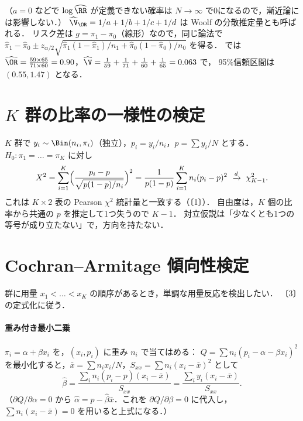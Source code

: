 （$a=0$ などで $\log\widehat{\RR}$ が定義できない確率は $N\to\infty$ で0になるので，漸近論には影響しない．）
$\widehat\V_{\OR}=1/a+1/b+1/c+1/d$ は Woolf の分散推定量とも呼ばれる．
リスク差は $g=\pi_1-\pi_0$（線形）なので，同じ論法で $\hat\pi_1-\hat\pi_0\pm z_{\alpha/2}\sqrt{\hat\pi_1(1-\hat\pi_1)/n_1+\hat\pi_0(1-\hat\pi_0)/n_0}$ を得る．
 では $\widehat{\OR}=\frac{59\times65}{71\times60}=0.90$，$\widehat\V=\frac1{59}+\frac1{71}+\frac1{60}+\frac1{65}=0.063$ で，
95\%信頼区間は $(0.55,1.47)$ となる．

\section{\texorpdfstring{$K$}{K} 群の比率の一様性の検定}\label{sec:04-homog}
$K$ 群で $y_i\sim\Bin(n_i,\pi_i)$（独立），$p_i=y_i/n_i$，$p=\sum y_i/N$ とする．$H_0:\pi_1=\dots=\pi_K$ に対し
\begin{equation}
X^2=\sum_{i=1}^K\Bigl(\frac{p_i-p}{\sqrt{p(1-p)/n_i}}\Bigr)^2=\frac{1}{p(1-p)}\sum_{i=1}^Kn_i(p_i-p)^2\ \xrightarrow{d}\ \chi^2_{K-1}.\label{eq:04-homog}
\end{equation}
これは $K\times2$ 表の Pearson $\chi^2$ 統計量と一致する（〔1〕）．
自由度は，$K$ 個の比率から共通の $p$ を推定して1つ失うので $K-1$．
対立仮説は「少なくとも1つの等号が成り立たない」で，方向を持たない．

\section{Cochran--Armitage 傾向性検定}\label{sec:04-trend}
\Hinshutsu 群に用量 $x_1<\dots<x_K$ の順序があるとき，単調な用量反応を検出したい．
〔3〕の定式化に従う．

\paragraph{重み付き最小二乗}
$\pi_i=\alpha+\beta x_i$ を，$(x_i,p_i)$ に重み $n_i$ で当てはめる：
$Q=\sum n_i(p_i-\alpha-\beta x_i)^2$ を最小化すると，$\bar x=\sum n_ix_i/N$，$S_{xx}=\sum n_i(x_i-\bar x)^2$ として
\begin{equation}
\hat\beta=\frac{\sum_in_i(p_i-p)(x_i-\bar x)}{S_{xx}}=\frac{\sum_iy_i(x_i-\bar x)}{S_{xx}}.\label{eq:04-cabeta}
\end{equation}
（$\partial Q/\partial\alpha=0$ から $\hat\alpha=p-\hat\beta\bar x$．これを $\partial Q/\partial\beta=0$ に代入し，
$\sum n_i(x_i-\bar x)=0$ を用いると上式になる．）

